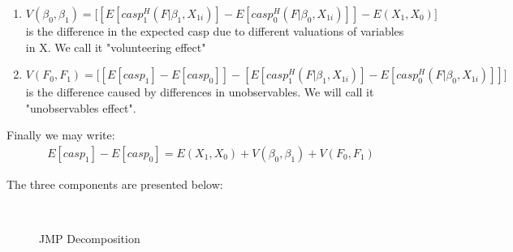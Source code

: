 \documentclass[10pt, letterpaper]{article}
\begin{document}
\begin{spacing}{1.4}
\begin{enumerate}
\item $ V(\beta_{0},\beta_{1}) =\bigg[ [E[casp^{H}_{1}(F|\beta_{1},X_{1i})]- E[casp^{H}_{0}(F|\beta_{0},X_{1i})]] -E(X_{1},X_{0})\bigg]$ is the difference in the expected casp due to different valuations of variables in X. We call it "volunteering effect"

\item $ V(F_{0},F_{1}) =\bigg[ [E[casp_{1}]-E[casp_{0}]] - [E[casp^{H}_{1}(F|\beta_{1},X_{1i})]- E[casp^{H}_{0}(F|\beta_{0},X_{1i})]] \bigg] $ is the difference caused by differences in unobservables. We will call it "unobservables effect".

\end{enumerate}

Finally  we may write:
  \begin{eqnarray} 
	E[casp_{1}]-E[casp_{0}]= E(X_{1},X_{0}) +  V(\beta_{0},\beta_{1}) +  V(F_{0},F_{1})
 \end{eqnarray}


The three components are presented below:


\begin{figure}[H]
\centering
\caption{JMP Decomposition} 
\label{fig:pooling1}
\begin{minipage}{1\linewidth}
\quad
{}~\\


\end{minipage}
\end{figure}
\end{spacing}
\end{document}
